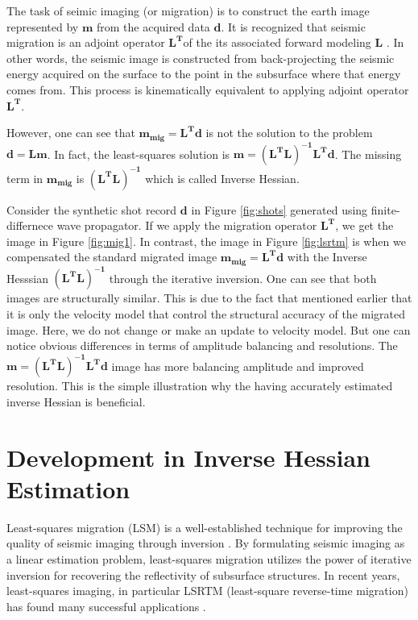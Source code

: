 The task of seimic imaging (or migration) is to construct the earth image represented by $\mathbf{m}$ from the acquired data $\mathbf{d}$. It is recognized that seismic migration is an adjoint operator $\mathbf{L^T}$of the its associated forward modeling $\mathbf{L}$ \cite[]{claerbout1992earth}. In other words, the seismic image is constructed from back-projecting the seismic energy acquired on the surface to the point in the subsurface where that energy comes from. This process is kinematically equivalent to applying adjoint operator $\mathbf{L^T}$.

However, one can see that $\mathbf{m_{mig} = L^{T}d}$ is not the solution to the problem $\mathbf{d=Lm}$. In fact, the least-squares solution is $\mathbf{m = (L^{T}L)^{-1} L^{T} d}$. The missing term in $\mathbf{m_{mig}}$ is $\mathbf{(L^{T}L)^{-1}}$ which is called Inverse Hessian.


Consider the synthetic shot record $\mathbf{d}$ in Figure \ref{fig:shots} generated using finite-differnece wave propagator. If we apply the migration operator $\mathbf{L^T}$, we get the image in Figure \ref{fig:mig1}. In contrast, the image in Figure \ref{fig:lsrtm} is when we compensated the standard migrated image $\mathbf{m_{mig} = L^{T}d }$ with the Inverse Hesssian $\mathbf{(L^{T}L)^{-1}}$ through the iterative inversion. One can see that both images are structurally similar. This is due to the fact that mentioned earlier that it is only the velocity model that control the structural accuracy of the migrated image. Here, we do not change or make an update to velocity model. But one can notice obvious differences in terms of amplitude balancing and resolutions. The $\mathbf{m = (L^{T}L)^{-1} L^{T} d}$ image has more balancing amplitude and improved resolution. This is the simple illustration why the having accurately estimated inverse Hessian is beneficial.


\section{Development in Inverse Hessian Estimation}

Least-squares migration (LSM) is a well-established technique for improving the quality of seismic imaging through inversion \cite[]{nemeth,ronen}. By formulating seismic imaging as a linear estimation problem, least-squares migration utilizes the power of iterative inversion for recovering the reflectivity of subsurface structures. In recent years, least-squares imaging, in particular LSRTM (least-square reverse-time migration) has found many successful applications \cite[]{dai,wang,wong}.

